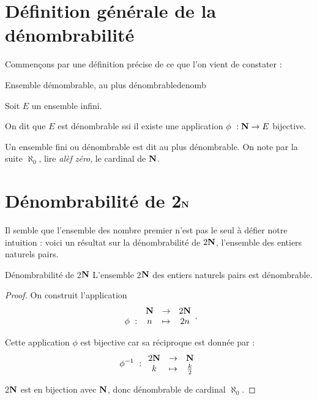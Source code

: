 \documentclass[a4paper,french,final]{memoir}
\begin{document}
\section{Définition générale de la dénombrabilité}
Commençons par une définition précise de ce que l'on vient de constater :
\begin{defb}{Ensemble démombrable, au plus dénombrable}{denomb}

	 Soit $E$ un ensemble infini.

	 On dit que $E$ est dénombrable ssi il existe une application $\phi~: \NN \to E $ bijective.

	 Un ensemble fini ou dénombrable est dit au plus dénombrable. \newline
	 On note par la suite $\aleph_0$, lire \emph{alèf zéro}\footnotemark, le cardinal de $\mathbf{N}$.
\end{defb}


\section{\texorpdfstring{Dénombrabilité de 2$\mathbf{N}$}{Dénombrabilité de 2N}}
\label{sec:denombrabilite_usuelle}
Il semble que l'ensemble des nombre premier n'est pas le seul à défier notre intuition :  voici un résultat sur la dénombrabilité de  $2\mathbf{N}$, l'ensemble des entiers naturels pairs.

\begin{theoremb}{Dénombrabilité de 2$\mathbf{N}$}{}
	L'ensemble 2$\mathbf{N}$ des entiers naturels pairs est dénombrable.
\end{theoremb}

\begin{proof}
	On construit l'application \[ \begin{array}{cccc}
	\ & \NN& \to& 2\NN \\
	\phi~: & n & \mapsto & 2n
	\end{array}.\]

  Cette application $\phi $ est bijective car sa réciproque est donnée par :
  \[ \phi^{-1}~: \begin{array}{ccc}
	2\NN & \to & \NN\\
	k & \mapsto & \frac{k}{2}
	\end{array}\]

	2$\mathbf{N}$ est en bijection avec $\mathbf{N}$, donc dénombrable de cardinal $\aleph_0$.
\end{proof}
\end{document}
